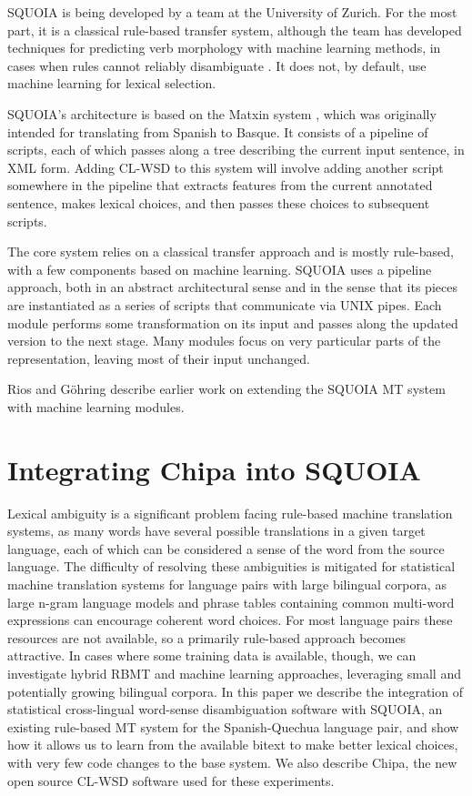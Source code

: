 SQUOIA is being developed by a team at the University of Zurich. For the most
part, it is a classical rule-based transfer system, although the team has
developed techniques for predicting verb morphology with machine
learning methods, in cases when rules cannot reliably disambiguate
\cite{riosgonzales-gohring:2013:HyTra}. It does not, by default, use machine
learning for lexical selection.

SQUOIA's architecture is based on the Matxin system \cite{matxin2005}, which
was originally intended for translating from Spanish to Basque.
It consists of a pipeline of scripts, each of which passes along a tree
describing the current input sentence, in XML form. Adding CL-WSD to this
system will involve adding another script somewhere in the pipeline that
extracts features from the current annotated sentence, makes lexical choices,
and then passes these choices to subsequent scripts.

The core system relies on a classical transfer approach and is mostly
rule-based, with a few components based on machine learning.
SQUOIA uses a pipeline approach, both in an abstract architectural sense and in
the sense that its pieces are instantiated as a series of scripts that communicate
via UNIX pipes. Each module performs some transformation on its input and
passes along the updated version to the next stage. Many modules focus on very
particular parts of the representation, leaving most of their input unchanged.

Rios and G\"{o}hring \cite{riosgonzales-gohring:2013:HyTra} describe
earlier work on extending the SQUOIA MT system with machine learning modules.

\section{Integrating Chipa into SQUOIA}

Lexical ambiguity is a significant problem facing rule-based machine
translation systems, as many words have several possible translations in a
given target language, each of which can be considered a sense of the word from
the source language.
The difficulty of resolving these ambiguities is mitigated for 
statistical machine translation systems for language pairs with large bilingual
corpora, as large n-gram language models and phrase tables containing common
multi-word expressions can encourage coherent word choices.
For most language pairs these resources are not available, so a primarily
rule-based approach becomes attractive.
In cases where some training data is available, though, we can
investigate hybrid RBMT and machine learning approaches, leveraging small and
potentially growing bilingual corpora. In this paper we
describe the integration of statistical cross-lingual word-sense disambiguation
software with SQUOIA, an existing rule-based MT system for the Spanish-Quechua
language pair, and show how it allows us to learn from the available bitext to
make better lexical choices, with very few code changes to the base system. We
also describe Chipa, the new open source CL-WSD software used for these
experiments.


